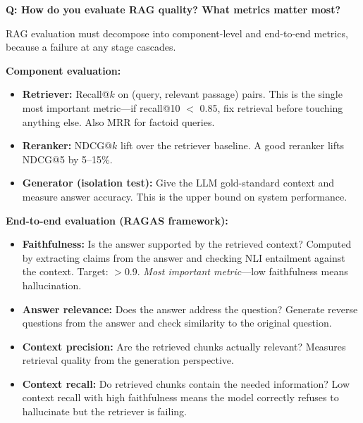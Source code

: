\begin{interviewq}
\end{interviewq}


\begin{interviewq}
\textbf{Q: How do you evaluate RAG quality? What metrics matter most?}

 \quad {} \quad \badgefreq{\freqhigh}

\stronganswer

RAG evaluation must decompose into component-level and end-to-end metrics, because a failure at any stage cascades.

\textbf{Component evaluation:}
\begin{itemize}
    \item \textbf{Retriever:} Recall@$k$ on (query, relevant passage) pairs. This is the single most important metric---if recall@10 $<$ 0.85, fix retrieval before touching anything else. Also MRR for factoid queries.
    \item \textbf{Reranker:} NDCG@$k$ lift over the retriever baseline. A good reranker lifts NDCG@5 by 5--15\%.
    \item \textbf{Generator (isolation test):} Give the LLM gold-standard context and measure answer accuracy. This is the upper bound on system performance.
\end{itemize}

\textbf{End-to-end evaluation (RAGAS framework):}
\begin{itemize}
    \item \textbf{Faithfulness:} Is the answer supported by the retrieved context? Computed by extracting claims from the answer and checking NLI entailment against the context. Target: $>$0.9. \textit{Most important metric}---low faithfulness means hallucination.
    \item \textbf{Answer relevance:} Does the answer address the question? Generate reverse questions from the answer and check similarity to the original question.
    \item \textbf{Context precision:} Are the retrieved chunks actually relevant? Measures retrieval quality from the generation perspective.
    \item \textbf{Context recall:} Do retrieved chunks contain the needed information? Low context recall with high faithfulness means the model correctly refuses to hallucinate but the retriever is failing.
\end{itemize}


\end{interviewq}
